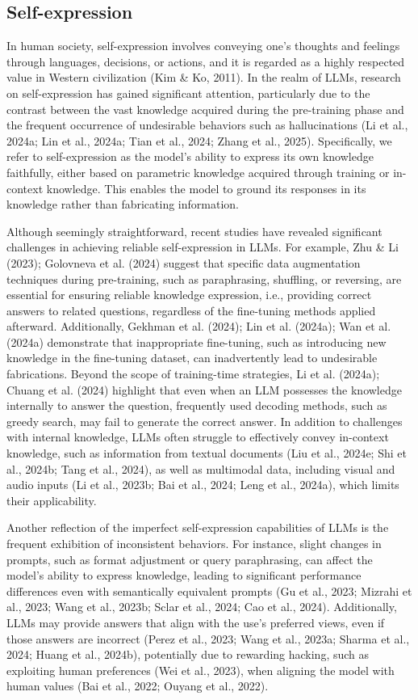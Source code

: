 \subsection{Self-expression}
\label{sec:self_expression}

In human society, self-expression involves conveying one's thoughts and feelings through languages, decisions, or actions, and it is regarded as a highly respected value in Western civilization (Kim \& Ko, 2011). In the realm of LLMs, research on self-expression has gained significant attention, particularly due to the contrast between the vast knowledge acquired during the pre-training phase and the frequent occurrence of undesirable behaviors such as hallucinations (Li et al., 2024a; Lin et al., 2024a; Tian et al., 2024; Zhang et al., 2025). Specifically, we refer to self-expression as the model's ability to express its own knowledge faithfully, either based on parametric knowledge acquired through training or in-context knowledge. This enables the model to ground its responses in its knowledge rather than fabricating information.

Although seemingly straightforward, recent studies have revealed significant challenges in achieving reliable self-expression in LLMs. For example, Zhu \& Li (2023); Golovneva et al. (2024) suggest that specific data augmentation techniques during pre-training, such as paraphrasing, shuffling, or reversing, are essential for ensuring reliable knowledge expression, i.e., providing correct answers to related questions, regardless of the fine-tuning methods applied afterward. Additionally, Gekhman et al. (2024); Lin et al. (2024a); Wan et al. (2024a) demonstrate that inappropriate fine-tuning, such as introducing new knowledge in the fine-tuning dataset, can inadvertently lead to undesirable fabrications. Beyond the scope of training-time strategies, Li et al. (2024a); Chuang et al. (2024) highlight that even when an LLM possesses the knowledge internally to answer the question, frequently used decoding methods, such as greedy search, may fail to generate the correct answer. In addition to challenges with internal knowledge, LLMs often struggle to effectively convey in-context knowledge, such as information from textual documents (Liu et al., 2024e; Shi et al., 2024b; Tang et al., 2024), as well as multimodal data, including visual and audio inputs (Li et al., 2023b; Bai et al., 2024; Leng et al., 2024a), which limits their applicability.

Another reflection of the imperfect self-expression capabilities of LLMs is the frequent exhibition of inconsistent behaviors. For instance, slight changes in prompts, such as format adjustment or query paraphrasing, can affect the model's ability to express knowledge, leading to significant performance differences even with semantically equivalent prompts (Gu et al., 2023; Mizrahi et al., 2023; Wang et al., 2023b; Sclar et al., 2024; Cao et al., 2024). Additionally, LLMs may provide answers that align with the use's preferred views, even if those answers are incorrect (Perez et al., 2023; Wang et al., 2023a; Sharma et al., 2024; Huang et al., 2024b), potentially due to rewarding hacking, such as exploiting human preferences (Wei et al., 2023), when aligning the model with human values (Bai et al., 2022; Ouyang et al., 2022).
